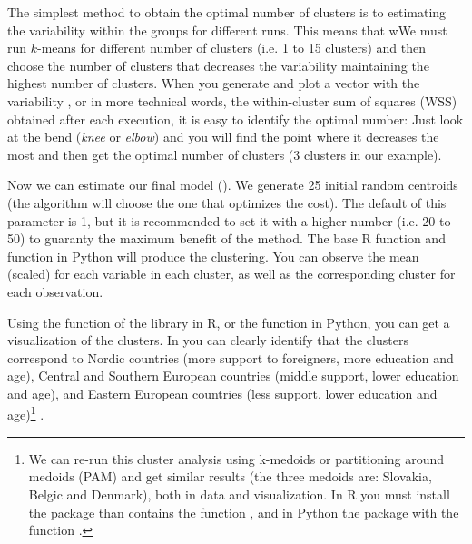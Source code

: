 The simplest method to obtain the optimal number of clusters is to
estimating the variability within the groups for different runs. This
means that wWe must run $k$-means for different number of clusters
(i.e. 1 to 15 clusters) and then choose the number of clusters that
decreases the variability maintaining the highest number of
clusters. When you generate and plot a vector with the variability ,
or in more technical words, the within-cluster sum of squares (WSS)
obtained after each execution, it is easy to identify the optimal
number: Just look at the bend (\textit{knee} or \textit{elbow}) and
you will find the point where it decreases the most and then get the
optimal number of clusters (3 clusters in our example).


Now we can estimate our final model (). We generate 25
initial random centroids (the algorithm will choose the one that
optimizes the cost). The default of this parameter is 1, but it is
recommended to set it with a higher number (i.e. 20 to 50) to guaranty
the maximum benefit of the method. The base R function  and
 function  in Python will produce the
clustering. You can observe the mean (scaled) for each variable in
each cluster, as well as the corresponding cluster for each
observation.


Using the function  of the library  in R, or the  function  in Python, you can get a visualization of the clusters. In  you can clearly identify that the clusters correspond to Nordic countries (more support to foreigners, more education and age), Central and Southern European countries (middle support, lower education and age), and Eastern European countries (less support, lower education and age)\footnote{We can re-run this cluster analysis using k-medoids or partitioning around medoids (PAM) and get similar results (the three medoids are: Slovakia, Belgic and Denmark), both in data and visualization. In R you must install the package  than contains the function , and in Python the package  with the function .} .



